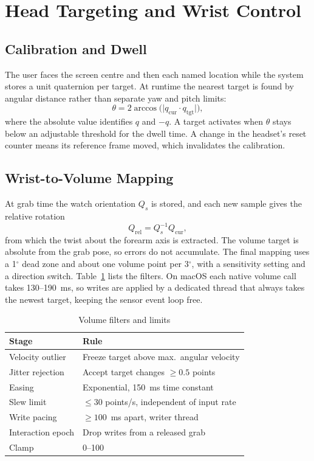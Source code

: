 \section{Head Targeting and Wrist Control}

\subsection{Calibration and Dwell}

The user faces the screen centre and then each named location while the system stores a unit quaternion per target. At runtime the nearest target is found by angular distance rather than separate yaw and pitch limits:
\begin{equation}
  \theta = 2\arccos\bigl(\lvert q_{\mathrm{cur}} \cdot q_{\mathrm{tgt}} \rvert\bigr),
\end{equation}
where the absolute value identifies $q$ and $-q$. A target activates when $\theta$ stays below an adjustable threshold for the dwell time. A change in the headset's reset counter means its reference frame moved, which invalidates the calibration.

\subsection{Wrist-to-Volume Mapping}

At grab time the watch orientation $Q_s$ is stored, and each new sample gives the relative rotation
\begin{equation}
  Q_{\mathrm{rel}} = Q_s^{-1} Q_{\mathrm{cur}},
\end{equation}
from which the twist about the forearm axis is extracted. The volume target is absolute from the grab pose, so errors do not accumulate. The final mapping uses a 1$^\circ$ dead zone and about one volume point per 3$^\circ$, with a sensitivity setting and a direction switch. Table~\ref{tab:filters} lists the filters. On macOS each native volume call takes 130--190~ms, so writes are applied by a dedicated thread that always takes the newest target, keeping the sensor event loop free.

\begin{table}[t]
  \centering
  \caption{Volume filters and limits}
  \label{tab:filters}
  \small
  \begin{tabular}{@{}ll@{}}
    \toprule
    Stage & Rule \\
    \midrule
    Velocity outlier & Freeze target above max.\ angular velocity \\
    Jitter rejection & Accept target changes $\geq 0.5$ points \\
    Easing & Exponential, 150~ms time constant \\
    Slew limit & $\leq 30$ points/s, independent of input rate \\
    Write pacing & $\geq 100$~ms apart, writer thread \\
    Interaction epoch & Drop writes from a released grab \\
    Clamp & 0--100 \\
    \bottomrule
  \end{tabular}
\end{table}

